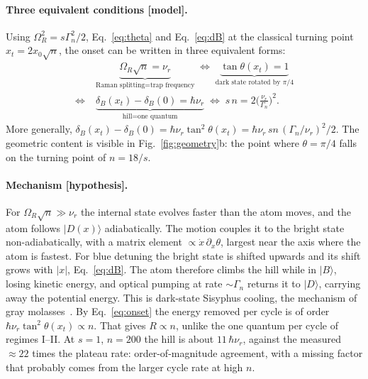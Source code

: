 \documentclass[11pt,a4paper]{article}
\newcommand{\ket}[1]{|#1\rangle}
\newcommand{\Om}{\Omega}
\newcommand{\nur}{\nu_r}
\begin{document}
\paragraph{Three equivalent conditions [model].} Using $\Om_R^2=s\Gamma_n^2/2$, Eq.~\eqref{eq:theta} and Eq.~\eqref{eq:dB} at the classical turning point $x_t=2x_0\sqrt n$, the onset can be written in three equivalent forms:
\begin{equation}
\begin{aligned}
  &\underbrace{\Om_R\sqrt n=\nur}_{\text{Raman splitting}=\text{trap frequency}}
  \;\Longleftrightarrow\;
  \underbrace{\tan\theta(x_t)=1}_{\text{dark state rotated by }\pi/4}\\[2pt]
  \Longleftrightarrow\;
  &\underbrace{\delta_B(x_t)-\delta_B(0)=\hbar\nur}_{\text{hill}=\text{one quantum}}
  \;\Longleftrightarrow\;
  s\,n=2\Big(\frac{\nur}{\Gamma_n}\Big)^2 .
\end{aligned}
  \label{eq:onset}
\end{equation}
More generally, $\delta_B(x_t)-\delta_B(0)=\hbar\nur\tan^2\theta(x_t)=\hbar\nur\,sn\,(\Gamma_n/\nur)^2/2$. The geometric content is visible in Fig.~\ref{fig:geometry}b: the point where $\theta=\pi/4$ falls on the turning point of $n=18/s$.

\paragraph{Mechanism [hypothesis].} For $\Om_R\sqrt n\gg\nur$ the internal state evolves faster than the atom moves, and the atom follows $\ket{D(x)}$ adiabatically. The motion couples it to the bright state non-adiabatically, with a matrix element $\propto\dot x\,\partial_x\theta$, largest near the axis where the atom is fastest. For blue detuning the bright state is shifted upwards and its shift grows with $|x|$, Eq.~\eqref{eq:dB}. The atom therefore climbs the hill while in $\ket B$, losing kinetic energy, and optical pumping at rate $\sim\Gamma_n$ returns it to $\ket D$, carrying away the potential energy. This is dark-state Sisyphus cooling, the mechanism of gray molasses~\cite{grynberg1994,weidemuller1994}. By Eq.~\eqref{eq:onset} the energy removed per cycle is of order $\hbar\nur\tan^2\theta(x_t)\propto n$. That gives $R\propto n$, unlike the one quantum per cycle of regimes I--II. At $s=1$, $n=200$ the hill is about $11\,\hbar\nur$, against the measured $\approx22$ times the plateau rate: order-of-magnitude agreement, with a missing factor that probably comes from the larger cycle rate at high $n$.
\end{document}
